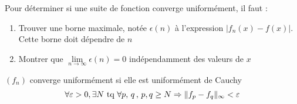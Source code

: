 \begin{note}
Pour déterminer si une suite de fonction converge uniformément, il faut :
\begin{enumerate}
	\item Trouver une borne maximale, notée $\epsilon(n)$ à l'expression $|f_n(x)-f(x)|$. Cette borne doit dépendre de $n$
    \item Montrer que $\lim\limits_{n\to\infty}\epsilon(n) = 0$ indépendamment des valeurs de $x$
\end{enumerate}
\end{note}

\begin{prop}
$(f_n)$ converge uniformément si elle est uniformément de Cauchy
$$\forall\varepsilon>0,\exists N \text{~tq~} \forall p,\,q\,,\,p,q\geq N \Rightarrow \|f_p-f_q\|_\infty < \varepsilon$$
\end{prop}


